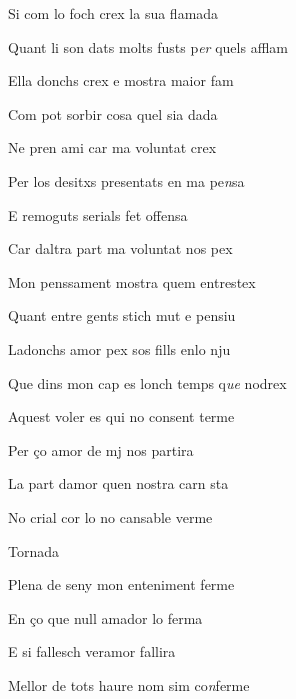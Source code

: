 \documentclass[12pt]{article}
\begin{document}
\begin{estrofa}

 Si com lo foch crex la sua flamada

 Quant li son dats molts fusts p\textit{er} quels afflam

 Ella donchs crex e mostra maior fam

 Com pot sorbir cosa quel sia dada

 Ne pren ami car ma voluntat crex

 Per los desitxs presentats en ma pe\textit{n}sa

 E remoguts serials fet offensa

 Car daltra part ma voluntat nos pex

\end{estrofa}



\begin{estrofa}

 Mon penssament mostra quem entrestex

 Quant entre gents stich mut e pensiu

 Ladonchs amor pex sos fills enlo nju

 Que dins mon cap es lonch temps q\textit{ue} nodrex

 Aquest voler es qui no consent terme

 Per \c{c}o amor de mj nos partira

 La part damor quen nostra carn sta

 No crial cor lo no cansable verme

\end{estrofa}


\begin{estrofaExtra}%




\begin{tornada}

Tornada

\end{tornada}


\end{estrofaExtra}


\begin{estrofa}

 Plena de seny mon enteniment ferme

 En \c{c}o que null amador lo ferma

 E si fallesch veramor fallira

 Mellor de tots haure nom sim co\textit{n}ferme

\end{estrofa}
\end{document}
